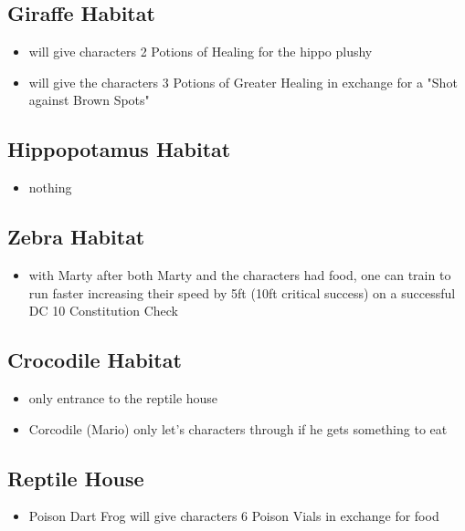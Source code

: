 \subsection*{ Giraffe Habitat}
\begin{itemize}
	\item will give characters 2 Potions of Healing for the hippo plushy
	\item will give the characters 3 Potions of Greater Healing in exchange for a "Shot against Brown Spots"
\end{itemize}
\subsection*{ Hippopotamus Habitat}
\begin{itemize}
	\item nothing
\end{itemize}
\subsection*{ Zebra Habitat}
\begin{itemize}
	\item with Marty after both Marty and the characters had food, one can train to run faster increasing their speed by 5ft (10ft critical success) on a successful DC 10 Constitution Check
\end{itemize}
\subsection*{ Crocodile Habitat}
\begin{itemize}
	\item only entrance to the reptile house
	\item Corcodile (Mario) only let's characters through if he gets something to eat
\end{itemize}
\subsection*{ Reptile House}
\begin{itemize}
	\item Poison Dart Frog will give characters 6 Poison Vials in exchange for food
\end{itemize}
